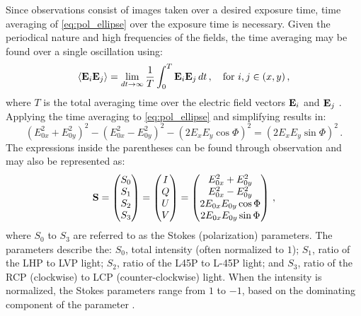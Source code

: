 Since observations consist of images taken over a desired exposure time, time averaging of \autoref{eq:pol_ellipse} over the exposure time is necessary.
Given the periodical nature and high frequencies of the fields, the time averaging may be found over a single oscillation using:
\begin{equation} \label{eq:pol_t_avg}
    \left< \mathbf{E}_{i} \mathbf{E}_{j} \right> = \lim_{dt \rightarrow \infty} \frac{1}{T} \int_{0}^{T} \mathbf{E}_{i} \mathbf{E}_{j}\,dt\,,\quad \text{for } i, j \in (x, y)\,,
\end{equation}
where $T$ is the total averaging time over the electric field vectors $\mathbf{E}_{i}$ and $\mathbf{E}_{j}$ \citep{field_guide}.
Applying the time averaging to \autoref{eq:pol_ellipse} and simplifying results in:
\begin{equation} \label{eq:pol_ellipse_alt}
    (E_{0x}^{2} + E_{0y}^{2})^{2} - (E_{0x}^{2} - E_{0y}^{2})^{2} - (2 E_{x} E_{y} \cos \Phi)^{2} = (2 E_{x} E_{y} \sin \Phi)^{2}\,.
\end{equation}
The expressions inside the parentheses can be found through observation and may also be represented as:
\begin{equation} \label{eq:Stokes_params}
    \mathbf{S} =
    \begin{pmatrix}
        S_{0} \\
        S_{1} \\
        S_{2} \\
        S_{3}
    \end{pmatrix}
    =
    \begin{pmatrix}
        I \\
        Q \\
        U \\
        V
    \end{pmatrix}
    =
    \begin{pmatrix}
        E_{0x}^{2} + E_{0y}^{2}   \\
        E_{0x}^{2} - E_{0y}^{2}   \\
        2 E_{0x} E_{0y} \cos \Phi \\
        2 E_{0x} E_{0y} \sin \Phi
    \end{pmatrix}\,,
\end{equation}
where $S_{0}$ to $ S_{3}$ are referred to as the Stokes (polarization) parameters.
The parameters describe the: $S_{0}$, total intensity (often normalized to $1$); $S_{1}$, ratio of the \gls{LHP} to \gls{LVP} light; $S_{2}$, ratio of the \gls{L45P} to \gls{L-45P} light; and $S_{3}$, ratio of the \gls{RCP} (clockwise) to \gls{LCP} (counter-clockwise) light.
When the intensity is normalized, the Stokes parameters range from $1$ to $-1$, based on the dominating component of the parameter \citep{Stokes, chandrasekhar}.

